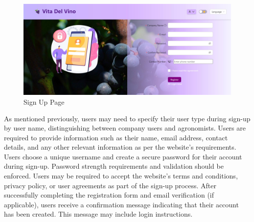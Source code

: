 \begin{enumerate}
\begin{itemize}
                    \begin{figure}
                        \centering
                        \includegraphics[width=0.75\linewidth]{images/SignUp.jpg}
                        \caption{Sign Up Page}
                        \label{fig:SignUp}
                    \end{figure}

                    As mentioned previously, users may need to specify their user type during sign-up by user name, distinguishing between company users and agronomists. Users are required to provide information such as their name, email address, contact details, and any other relevant information as per the website's requirements. Users choose a unique username and create a secure password for their account during sign-up. Password strength requirements and validation should be enforced. Users may be required to accept the website's terms and conditions, privacy policy, or user agreements as part of the sign-up process. After successfully completing the registration form and email verification (if applicable), users receive a confirmation message indicating that their account has been created. This message may include login instructions.


\end{itemize}
\end{enumerate}
